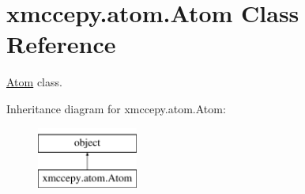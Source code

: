 \hypertarget{classxmccepy_1_1atom_1_1_atom}{\section{xmccepy.\-atom.\-Atom Class Reference}
\label{classxmccepy_1_1atom_1_1_atom}
}


\hyperlink{classxmccepy_1_1atom_1_1_atom}{Atom} class.  


Inheritance diagram for xmccepy.\-atom.\-Atom\-:\begin{figure}[H]
\begin{center}
\leavevmode
\includegraphics[height=2.000000cm]{classxmccepy_1_1atom_1_1_atom}
\end{center}
\end{figure}
